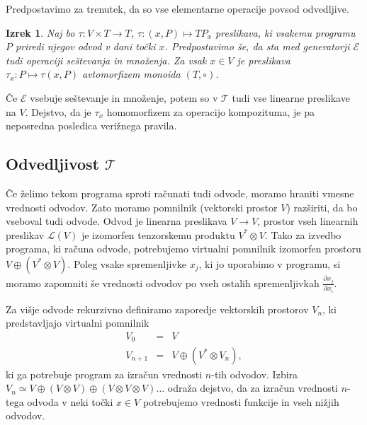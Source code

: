 \documentclass{article}
\newcommand{\E}{\mathcal{E}}
\newcommand{\T}{\mathcal{T}}
\newtheorem{izrek}{Izrek}[section]
\begin{document}
Predpostavimo za trenutek, da so vse elementarne operacije povsod odvedljive. 

\begin{izrek}
  Naj bo $\tau:V\times T\to T$, $\tau:(x,P)\mapsto TP_x$ preslikava,  ki vsakemu programu
  $P$ priredi njegov odvod v dani točki $x$. Predpostavimo še, da sta med generatorji $\E$
  tudi operaciji seštevanja in množenja. Za vsak $x\in V$ je preslikava
  $\tau_x:P\mapsto \tau(x,P)$ avtomorfizem monoida $(T,\circ)$. 
\end{izrek}
Če $\E$ vsebuje seštevanje in množenje, potem so v $\T$ tudi vse linearne preslikave
na $V$. Dejstvo, da je $\tau_x$ homomorfizem za operacijo kompozituma, je pa 
neposredna posledica verižnega pravila.

\subsection{Odvedljivost $\T$}
Če želimo tekom programa sproti računati tudi odvode, moramo hraniti vmesne
vrednosti odvodov. Zato moramo pomnilnik (vektorski prostor $V$) razširiti, da
bo vseboval tudi odvode. Odvod je linearna preslikava $V\to V$, prostor
vseh linearnih preslikav $\mathcal{L}(V)$ je izomorfen tenzorskemu produktu
$V^*\otimes V$. Tako za izvedbo programa, ki računa odvode, potrebujemo virtualni
pomnilnik izomorfen prostoru $V\oplus (V^*\otimes V)$. Poleg vsake spremenljivke $x_j$, ki
jo uporabimo v programu, si moramo zapomniti še vrednosti odvodov po vseh
ostalih spremenljivkah $\frac{\partial x_j}{\partial x_i}$.   

Za višje odvode rekurzivno definiramo zaporedje vektorskih prostorov $V_n$, ki
predstavljajo virtualni pomnilnik
\begin{eqnarray}
  \label{eq:prapor}
  V_0 &=& V\\
  V_{n+1}&=&V\oplus (V^*\otimes V_n),
\end{eqnarray} 
ki ga potrebuje program za izračun vrednosti $n$-tih odvodov. Izbira $V_n\simeq
V\oplus (V\otimes V) \oplus (V\otimes V\otimes V) \ldots$ odraža dejstvo, da za izračun vrednosti $n$-tega odvoda v neki točki $x\in V$
potrebujemo vrednosti funkcije in vseh nižjih odvodov.


  
\end{document}
